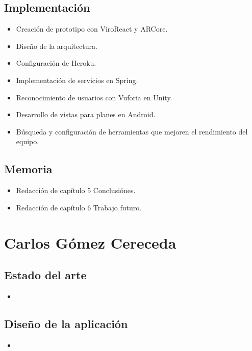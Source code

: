     \subsection{Implementación}
    \label{makereference7.2.3}
        \begin{itemize}
            \item Creación de prototipo con ViroReact y ARCore.
            \item Diseño de la arquitectura.
            \item Configuración de Heroku.
            \item Implementación de servicios en Spring.
            \item Reconocimiento de usuarios con Vuforia en Unity.
            \item Desarrollo de vistas para planes en Android.
            \item Búsqueda y configuración de herramientas que mejoren el
             rendimiento del equipo.
        \end{itemize}
    \subsection{Memoria}
    \label{makereference7.2.3}
        \begin{itemize}
            \item Redacción de capítulo 5 Conclusiónes.
            \item Redacción de capítulo 6 Trabajo futuro.
        \end{itemize}

\section{Carlos Gómez Cereceda}
\label{makereference7.3}
    \subsection{Estado del arte}
    \label{makereference7.3.1}
        \begin{itemize}
            \item
        \end{itemize}
    \subsection{Diseño de la aplicación}
    \label{makereference7.3.2}
        \begin{itemize}
            \item
        \end{itemize}
